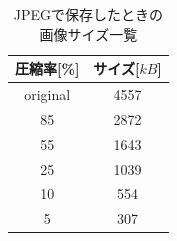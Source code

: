 \documentclass[a4paper,11pt]{bxjsarticle}
\begin{document}
   \begin{table}[htb]
    \begin{center}
      \caption{JPEGで保存したときの画像サイズ一覧}
      \begin{tabular}{|c|c|} \hline
        圧縮率[\%] & サイズ[$kB$] \\\hline
        original & 4557  \\
        85 & 2872  \\ 
        55 & 1643  \\
        25 & 1039 \\
        10 & 554 \\
        5 & 307 \\\hline

      \end{tabular}
      \label{tab:result_jpeg_filesize}
    \end{center}
  \end{table}
\end{document}
